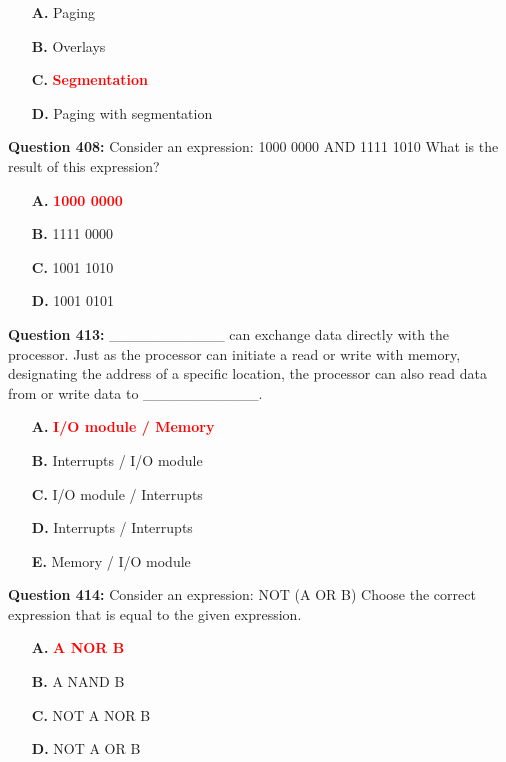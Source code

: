 \documentclass[12pt,a4paper]{article}
\begin{document}
\begin{itemize}
    \item[\textbf{A.}] Paging
    \item[\textbf{B.}] Overlays
    \item[\textbf{C.}] \textcolor{red}{\textbf{Segmentation}}
    \item[\textbf{D.}] Paging with segmentation
\end{itemize}

\vspace{0.5cm}

\textbf{Question 408:} Consider an expression: 1000 0000 AND 1111 1010 What is the result of this expression?

\begin{itemize}
    \item[\textbf{A.}] \textcolor{red}{\textbf{1000 0000}}
    \item[\textbf{B.}] 1111 0000
    \item[\textbf{C.}] 1001 1010
    \item[\textbf{D.}] 1001 0101
\end{itemize}

\vspace{0.5cm}

\textbf{Question 413:} ___________ can exchange data directly with the processor. Just as the processor can initiate a read or write with memory, designating the address of a specific location, the processor can also read data from or write data to ___________.

\begin{itemize}
    \item[\textbf{A.}] \textcolor{red}{\textbf{I/O module / Memory}}
    \item[\textbf{B.}] Interrupts / I/O module
    \item[\textbf{C.}] I/O module / Interrupts
    \item[\textbf{D.}] Interrupts / Interrupts
    \item[\textbf{E.}] Memory / I/O module
\end{itemize}

\vspace{0.5cm}

\textbf{Question 414:} Consider an expression: NOT (A OR B) Choose the correct expression that is equal to the given expression.

\begin{itemize}
    \item[\textbf{A.}] \textcolor{red}{\textbf{A NOR B}}
    \item[\textbf{B.}] A NAND B
    \item[\textbf{C.}] NOT A NOR B
    \item[\textbf{D.}] NOT A OR B
\end{itemize}
\end{document}
